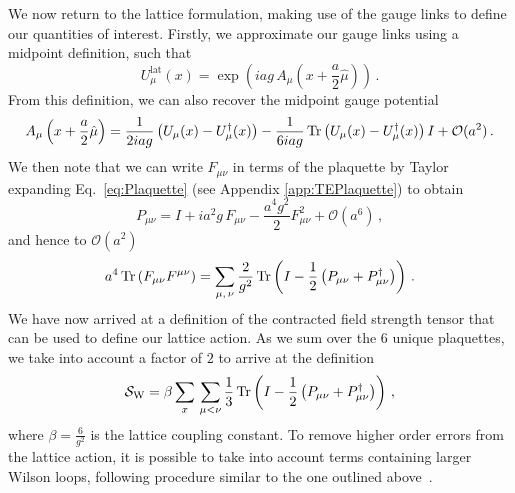 We now return to the lattice formulation, making use of the gauge links to define our quantities of interest. Firstly, we approximate our gauge links using a midpoint definition, such that
\begin{equation}
U_\mu^\text{lat}(x) = \exp\left(iag\, A_\mu\left(x+\frac{a}{2}\hat{\mu}\right)\right)\, .
\label{eq:GaugeLinkLat}
\end{equation}
From this definition, we can also recover the midpoint gauge potential~\cite{Leinweber:1998im,Alles:1996ka}
\begin{equation}
A_\mu\left(x+\frac{a}{2}\hat{\mu}\right) = \frac{1}{2iag}\left(U_\mu(x) - U_\mu^\dag(x)\right) - \frac{1}{6iag}\operatorname{Tr}\left(U_\mu(x) - U_\mu^\dag(x)\right)I + \mathcal{O}(a^2)\, .
\label{eq:GaugePotentialLat}
\end{equation}
We then note that we can write $F_{\mu\nu}$ in terms of the plaquette by Taylor expanding Eq.~\ref{eq:Plaquette} (see Appendix \ref{app:TEPlaquette}) to obtain~\cite{Gupta:1997nd}
%
\begin{equation}
P_{\mu\nu} = I+ia^2g\, F_{\mu\nu} - \frac{a^4 g^2}{2}F^2_{\mu\nu} +\mathcal{O}(a^6)\, ,
\label{eq:PlaquetteExpansion}
\end{equation} 
%
and hence to $\mathcal{O}(a^2)$
%
\begin{align}
a^4\operatorname{Tr}\left(F_{\mu\nu}F^{\mu\nu}\right) = \sum_{\mu,\,\nu}\frac{2}{g^2}\operatorname{Tr}\left(I-\frac{1}{2}\left(P_{\mu\nu}+P_{\mu\nu}^\dag\right)\right)\, .
\label{eq:FieldStrengthPlaquette}
\end{align}
%
We have now arrived at a definition of the contracted field strength tensor that can be used to define our lattice action. As we sum over the 6 unique plaquettes, we take into account a factor of $2$ to arrive at the definition 
%
\begin{equation}
\mathcal{S}_\text{W} = \beta\sum_x\,\sum_{\mu<\nu} \frac{1}{3}\operatorname{Tr}\left(I-\frac{1}{2}\left(P_{\mu\nu}+P_{\mu\nu}^\dag\right)\right)\, ,
\label{eq:WilsonAction}
\end{equation}
%
where $\beta = \frac{6}{g^2}$ is the lattice coupling constant. To remove higher order errors from the lattice action, it is possible to take into account terms containing larger Wilson loops, following procedure similar to the one outlined above~\cite{Alford:1995hw,Symanzik:1983dc,Symanzik:1983gh}.\\

